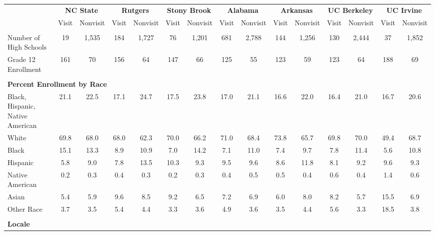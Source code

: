 \begin{tabular*}{\linewidth}{@{\extracolsep{\fill} } lcccccccccccccc}%
&\multicolumn{2}{c}{\bfseries NC State}&\multicolumn{2}{c}{\bfseries Rutgers}&\multicolumn{2}{c}{\bfseries Stony Brook}&\multicolumn{2}{c}{\bfseries Alabama}&\multicolumn{2}{c}{\bfseries Arkansas}&\multicolumn{2}{c}{\bfseries UC Berkeley}&\multicolumn{2}{c}{\bfseries UC Irvine}\\%
&Visit&\multicolumn{1}{l}{Nonvisit}&Visit&\multicolumn{1}{l}{Nonvisit}&Visit&\multicolumn{1}{l}{Nonvisit}&Visit&\multicolumn{1}{l}{Nonvisit}&Visit&\multicolumn{1}{l}{Nonvisit}&Visit&\multicolumn{1}{l}{Nonvisit}&Visit&\multicolumn{1}{l}{Nonvisit}\\%
\hline%
&&&&&&&&&&&&&&\\%
\hspace{0cm}Number of High Schools&19&1,535&184&1,727&76&1,201&681&2,788&144&1,256&130&2,444&37&1,852\\%
\hspace{0cm}Grade 12 Enrollment&161&70&156&64&147&66&125&55&123&59&123&64&188&69\\%
&&&&&&&&&&&&&&\\%
\multicolumn{15}{l}{\bfseries Percent Enrollment by Race}\\%
\hspace{0.2cm}Black, Hispanic, Native American&21.1&22.5&17.1&24.7&17.5&23.8&17.0&21.1&16.6&22.0&16.4&21.0&16.7&20.6\\%
\hspace{0.2cm}White&69.8&68.0&68.0&62.3&70.0&66.2&71.0&68.4&73.8&65.7&69.8&70.0&49.4&68.7\\%
\hspace{0.2cm}Black&15.1&13.3&8.9&10.9&7.0&14.2&7.1&11.0&7.4&9.7&7.8&11.4&5.6&10.8\\%
\hspace{0.2cm}Hispanic&5.8&9.0&7.8&13.5&10.3&9.3&9.5&9.6&8.6&11.8&8.1&9.2&9.6&9.3\\%
\hspace{0.2cm}Native American&0.2&0.3&0.4&0.3&0.2&0.3&0.4&0.5&0.5&0.4&0.6&0.4&1.4&0.6\\%
\hspace{0.2cm}Asian&5.4&5.9&9.6&8.5&9.2&6.5&7.2&6.9&6.0&8.0&8.2&5.7&15.5&6.9\\%
\hspace{0.2cm}Other Race&3.7&3.5&5.4&4.4&3.3&3.6&4.9&3.6&3.5&4.4&5.6&3.3&18.5&3.8\\%
&&&&&&&&&&&&&&\\%
\multicolumn{15}{l}{\bfseries Locale}\\%

\end{tabular*}

